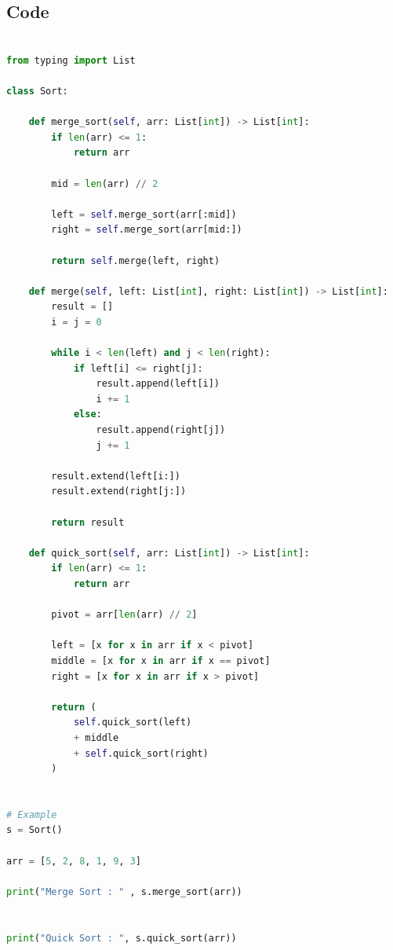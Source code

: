 

\subsection*{Code}
\begin{lstlisting}[language=Python]     % change the language attribute to C++ in case of C++ code.

from typing import List

class Sort:

    def merge_sort(self, arr: List[int]) -> List[int]:
        if len(arr) <= 1:
            return arr

        mid = len(arr) // 2

        left = self.merge_sort(arr[:mid])
        right = self.merge_sort(arr[mid:])

        return self.merge(left, right)

    def merge(self, left: List[int], right: List[int]) -> List[int]:
        result = []
        i = j = 0

        while i < len(left) and j < len(right):
            if left[i] <= right[j]:
                result.append(left[i])
                i += 1
            else:
                result.append(right[j])
                j += 1

        result.extend(left[i:])
        result.extend(right[j:])

        return result

    def quick_sort(self, arr: List[int]) -> List[int]:
        if len(arr) <= 1:
            return arr

        pivot = arr[len(arr) // 2]

        left = [x for x in arr if x < pivot]
        middle = [x for x in arr if x == pivot]
        right = [x for x in arr if x > pivot]

        return (
            self.quick_sort(left)
            + middle
            + self.quick_sort(right)
        )


# Example
s = Sort()

arr = [5, 2, 8, 1, 9, 3]

print("Merge Sort : " , s.merge_sort(arr))


print("Quick Sort : ", s.quick_sort(arr))

    
\end{lstlisting}

